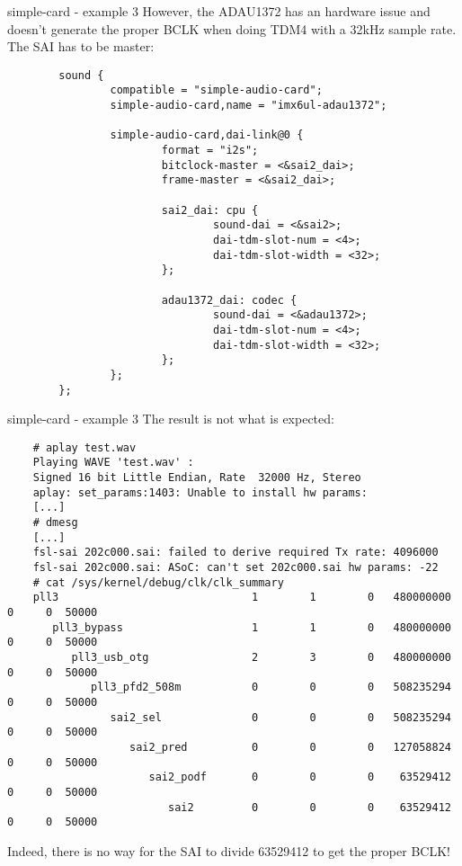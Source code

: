 \begin{frame}[fragile]{simple-card - example 3}
  However, the ADAU1372 has an hardware issue and doesn't generate the
  proper BCLK when doing TDM4 with a 32kHz sample rate. The SAI has to
  be master:
  \begin{block}{}
    \fontsize{7}{6}\selectfont
    \begin{verbatim}
        sound {
                compatible = "simple-audio-card";
                simple-audio-card,name = "imx6ul-adau1372";

                simple-audio-card,dai-link@0 {
                        format = "i2s";
                        bitclock-master = <&sai2_dai>;
                        frame-master = <&sai2_dai>;

                        sai2_dai: cpu {
                                sound-dai = <&sai2>;
                                dai-tdm-slot-num = <4>;
                                dai-tdm-slot-width = <32>;
                        };

                        adau1372_dai: codec {
                                sound-dai = <&adau1372>;
                                dai-tdm-slot-num = <4>;
                                dai-tdm-slot-width = <32>;
                        };
                };
        };
    \end{verbatim}
  \end{block}
\end{frame}

\begin{frame}[fragile]{simple-card - example 3}
  The result is not what is expected:
  \begin{block}{}
    \fontsize{7}{6}\selectfont
    \begin{verbatim}
    # aplay test.wav
    Playing WAVE 'test.wav' :
    Signed 16 bit Little Endian, Rate  32000 Hz, Stereo
    aplay: set_params:1403: Unable to install hw params:
    [...]
    # dmesg
    [...]
    fsl-sai 202c000.sai: failed to derive required Tx rate: 4096000
    fsl-sai 202c000.sai: ASoC: can't set 202c000.sai hw params: -22
    # cat /sys/kernel/debug/clk/clk_summary
    pll3                              1        1        0   480000000          0     0  50000
       pll3_bypass                    1        1        0   480000000          0     0  50000
          pll3_usb_otg                2        3        0   480000000          0     0  50000
             pll3_pfd2_508m           0        0        0   508235294          0     0  50000
                sai2_sel              0        0        0   508235294          0     0  50000
                   sai2_pred          0        0        0   127058824          0     0  50000
                      sai2_podf       0        0        0    63529412          0     0  50000
                         sai2         0        0        0    63529412          0     0  50000
    \end{verbatim}
  \end{block}
  Indeed, there is no way for the SAI to divide 63529412 to get the
  proper BCLK!
\end{frame}

